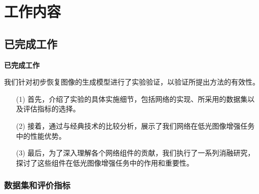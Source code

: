 \documentclass[CJK,aspectratio=169]{beamer}  %
\begin{document}
	\section{工作内容}
	
	\subsection{已完成工作}
	
	\begin{frame}
		{ \yahei \textbf{已完成工作}}
		
		{ \yahei 我们针对初步恢复图像的生成模型进行了实验验证，以验证所提出方法的有效性。}
		
		\begin{itemize}
			\item [(1)] 首先，介绍了实验的具体实施细节，包括网络的实现、所采用的数据集以及评估指标的选择。
			\item [(2)] 接着，通过与经典技术的比较分析，展示了我们网络在低光图像增强任务中的性能优势。
			\item [(3)] 最后，为了深入理解各个网络组件的贡献，我们执行了一系列消融研究，探讨了这些组件在低光图像增强任务中的作用和重要性。
		\end{itemize}
		
	\end{frame}
	
	
	\subsubsection{数据集和评价指标}
	
\end{document}
